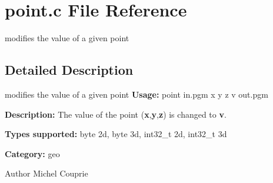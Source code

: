 \section{point.c File Reference}
\label{point_8c}


modifies the value of a given point  




\subsection{Detailed Description}
modifies the value of a given point {\bfseries Usage:} point in.pgm x y z v out.pgm

{\bfseries Description:} The value of the point ({\bfseries x},{\bfseries y},{\bfseries z}) is changed to {\bfseries v}.

{\bfseries Types supported:} byte 2d, byte 3d, int32\_\-t 2d, int32\_\-t 3d

{\bfseries Category:} geo

\begin{DoxyAuthor}{Author}
Michel Couprie 
\end{DoxyAuthor}
